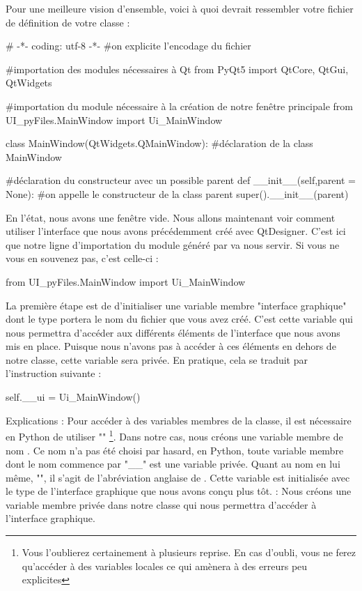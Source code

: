 Pour une meilleure vision d'ensemble, voici à quoi devrait ressembler votre fichier de définition de votre classe  :
\begin{Python}
# -*- coding: utf-8 -*-
#on explicite l’encodage du fichier

#importation des modules nécessaires à Qt
from PyQt5 import QtCore, QtGui, QtWidgets

#importation du module nécessaire à la création de notre fenêtre principale
from UI_pyFiles.MainWindow import Ui_MainWindow

class MainWindow(QtWidgets.QMainWindow): #déclaration de la class MainWindow

	#déclaration du constructeur avec un possible parent
	def __init__(self,parent = None):
		#on appelle le constructeur de la class parent
		super().__init__(parent)
\end{Python}

En l'état, nous avons une fenêtre vide. Nous allons maintenant voir comment utiliser l'interface que nous avons précédemment créé avec QtDesigner.\newline
C'est ici que notre ligne d'importation du module généré par  va nous servir. Si vous ne vous en souvenez pas, c'est celle-ci :
\begin{Python}
from UI_pyFiles.MainWindow import Ui_MainWindow
\end{Python}
La première étape est de d'initialiser une variable membre "interface graphique" dont le type portera le nom du fichier  que vous avez créé.\newline
C'est cette variable qui nous permettra d'accéder aux différents éléments de l'interface que nous avons mis en place.\newline
Puisque nous n'avons pas à accéder à ces éléments en dehors de notre classe, cette variable sera privée.\newline
En pratique, cela se traduit par l'instruction suivante :
\begin{Python}
self.__ui = Ui_MainWindow()
\end{Python}
Explications : 
Pour accéder à des variables membres de la classe, il est nécessaire en Python de  utiliser ""
\footnote{Vous l'oublierez certainement à plusieurs reprise. En cas d'oubli, vous ne ferez qu'accéder à des variables locales ce qui amènera à des erreurs peu explicites}. Dans notre cas, nous créons une variable membre de nom .\newline
Ce nom n'a pas été choisi par hasard, en Python, toute variable membre dont le nom commence par "\_\_" est une variable privée. Quant au nom en lui même,  "", il s'agit de l'abréviation anglaise de .\newline
Cette variable est initialisée avec le type de l'interface graphique que nous avons conçu plus tôt.\newline
{} : Nous créons une variable membre privée dans notre classe qui nous permettra d'accéder à l'interface graphique.\\

